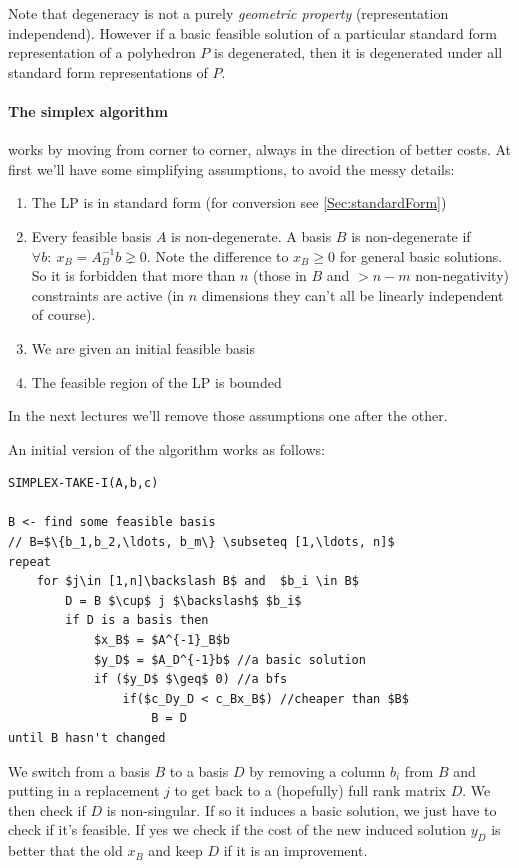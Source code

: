 Note that degeneracy is not a purely \emph{geometric property} (representation independend). However if a basic feasible solution of a particular standard form representation of a polyhedron $P$ is degenerated, then it is degenerated under all standard form representations of $P$.


\paragraph*{The simplex algorithm} works by moving from corner to corner, always in the direction of better costs. At first we'll have some simplifying assumptions, to avoid the messy details:

\begin{enumerate}
\item The LP is in standard form (for conversion see \ref{Sec:standardForm})
\item Every feasible basis $A$ is non-degenerate. A basis $B$ is non-degenerate if $\forall b:\ x_B=A^{-1}_Bb \gneq 0$. Note the difference to $x_B\geq 0$ for general basic solutions. So it is forbidden that more than $n$ (those in $B$ and $>n-m$ non-negativity) constraints are active (in $n$ dimensions they can't all be linearly independent of course). 
\item We are given an initial feasible basis
\item The feasible region of the LP is bounded
\end{enumerate}

In the next lectures we'll remove those assumptions one after the other.

An initial version of the algorithm works as follows:
\begin{center}
\begin{lstlisting}
SIMPLEX-TAKE-I(A,b,c)

B <- find some feasible basis
// B=$\{b_1,b_2,\ldots, b_m\} \subseteq [1,\ldots, n]$
repeat 
    for $j\in [1,n]\backslash B$ and  $b_i \in B$
        D = B $\cup$ j $\backslash$ $b_i$
        if D is a basis then
            $x_B$ = $A^{-1}_B$b
            $y_D$ = $A_D^{-1}b$ //a basic solution
            if ($y_D$ $\geq$ 0) //a bfs
                if($c_Dy_D < c_Bx_B$) //cheaper than $B$
                    B = D
until B hasn't changed                
\end{lstlisting}
\end{center}

We switch from a basis $B$ to a basis $D$ by removing a column $b_i$ from $B$ and putting in a replacement $j$ to get back to a (hopefully) full rank matrix $D$. We then check if $D$ is non-singular. If so it induces a basic solution, we just have to check if it's feasible. If yes we check if the cost of the new induced solution $y_D$ is better that the old $x_B$ and keep $D$ if it is an improvement.

